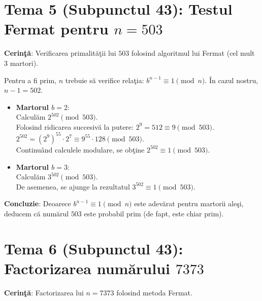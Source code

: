 \documentclass[12pt, a4paper]{article}
\begin{document}
\vspace{0.5cm}

\section*{Tema 5 (Subpunctul 43): Testul Fermat pentru $n = 503$}

\textbf{Cerin\c{t}\u{a}}: Verificarea primalit\u{a}\c{t}ii lui $503$ folosind algoritmul lui Fermat (cel mult 3 martori).

Pentru a fi prim, $n$ trebuie s\u{a} verifice rela\c{t}ia: $b^{n-1} \equiv 1 \pmod n$. \^{I}n cazul nostru, $n-1 = 502$.

\begin{itemize}
    \item \textbf{Martorul $b = 2$}: \\
    Calcul\u{a}m $2^{502} \pmod{503}$. \\
    Folosind ridicarea succesiv\u{a} la putere: $2^9 = 512 \equiv 9 \pmod{503}$. \\
    $2^{502} = (2^9)^{55} \cdot 2^7 \equiv 9^{55} \cdot 128 \pmod{503}$. \\
    Continu\^{a}nd calculele modulare, se ob\c{t}ine $2^{502} \equiv 1 \pmod{503}$.
    
    \item \textbf{Martorul $b = 3$}: \\
    Calcul\u{a}m $3^{502} \pmod{503}$. \\
    De asemenea, se ajunge la rezultatul $3^{502} \equiv 1 \pmod{503}$.
\end{itemize}

\textbf{Concluzie}: Deoarece $b^{n-1} \equiv 1 \pmod n$ este adev\u{a}rat pentru martorii ale\c{s}i, deducem c\u{a} num\u{a}rul $503$ este probabil prim (de fapt, este chiar prim).

\vspace{0.5cm}

\section*{Tema 6 (Subpunctul 43): Factorizarea num\u{a}rului $7373$}

\textbf{Cerin\c{t}\u{a}}: Factorizarea lui $n = 7373$ folosind metoda Fermat.
\end{document}
